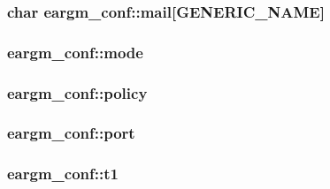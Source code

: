 \subsubsection[{\texorpdfstring{mail}{mail}}]{\setlength{\rightskip}{0pt plus 5cm}char eargm\+\_\+conf\+::mail\mbox{[}{\bf G\+E\+N\+E\+R\+I\+C\+\_\+\+N\+A\+ME}\mbox{]}}\hypertarget{structeargm__conf_a32b7ae376a295a99842245f8e571f145}{}\label{structeargm__conf_a32b7ae376a295a99842245f8e571f145}
\subsubsection[{\texorpdfstring{mode}{mode}}]{ eargm\+\_\+conf\+::mode}\hypertarget{structeargm__conf_a6ac8156dbf0983841e5c51ee92a12ade}{}\label{structeargm__conf_a6ac8156dbf0983841e5c51ee92a12ade}
\subsubsection[{\texorpdfstring{policy}{policy}}]{ eargm\+\_\+conf\+::policy}\hypertarget{structeargm__conf_a14f8bedf2d28594a9636993d4b33f01b}{}\label{structeargm__conf_a14f8bedf2d28594a9636993d4b33f01b}
\subsubsection[{\texorpdfstring{port}{port}}]{ eargm\+\_\+conf\+::port}\hypertarget{structeargm__conf_a4ef8b32b98933c0ca007367ef5a0732a}{}\label{structeargm__conf_a4ef8b32b98933c0ca007367ef5a0732a}
\subsubsection[{\texorpdfstring{t1}{t1}}]{ eargm\+\_\+conf\+::t1}\hypertarget{structeargm__conf_ac6da327bd1d1a48c38860ef4eb1d94f6}{}\label{structeargm__conf_ac6da327bd1d1a48c38860ef4eb1d94f6}
